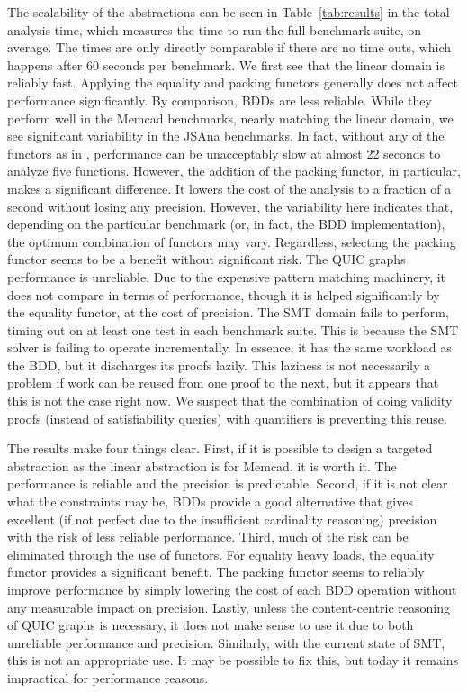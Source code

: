 The scalability of the abstractions can be seen in Table~\ref{tab:results} in the total analysis time, which measures the time to run the full benchmark suite, on average.  The times are only directly comparable if there are no time outs, which happens after 60 seconds per benchmark.  We first see that the linear domain is reliably fast.  Applying the equality and packing functors generally does not affect performance significantly.  By comparison, BDDs are less reliable.  While they perform well in the Memcad benchmarks, nearly matching the linear domain, we see significant variability in the JSAna benchmarks.  In fact, without any of the functors as in \cite{ab:ecoop:13}, performance can be unacceptably slow at almost 22 seconds to analyze five functions.  However, the addition of the packing functor, in particular, makes a significant difference.  It lowers the cost of the analysis to a fraction of a second without losing any precision.  However, the variability here indicates that, depending on the particular benchmark (or, in fact, the BDD implementation), the optimum combination of functors may vary.  Regardless, selecting the packing functor seems to be a benefit without significant risk.  The QUIC graphs performance is unreliable.  Due to the expensive pattern matching machinery, it does not compare in terms of performance, though it is helped significantly by the equality functor, at the cost of precision.  The SMT domain fails to perform, timing out on at least one test in each benchmark suite.  This is because the SMT solver is failing to operate incrementally.  In essence, it has the same workload as the BDD, but it discharges its proofs lazily.  This laziness is not necessarily a problem if work can be reused from one proof to the next, but it appears that this is not the case right now.  We suspect that the combination of doing validity proofs (instead of satisfiability queries) with quantifiers is preventing this reuse.

The results make four things clear.
First, if it is possible to design a targeted abstraction as the linear
abstraction is for Memcad, it is worth it.
The performance is reliable and the precision is predictable.
Second, if it is not clear what the constraints may be, BDDs provide a
good alternative that gives excellent (if not perfect due to the
insufficient cardinality reasoning) precision with the risk of less
reliable performance.
Third, much of the risk can be eliminated through the use of functors.  For equality heavy loads, the equality functor provides a significant benefit.  The packing functor seems to reliably improve performance by simply lowering the cost of each BDD operation without any measurable impact on precision.  Lastly, unless the content-centric reasoning of QUIC graphs is necessary, it does not make sense to use it due to both unreliable performance and precision.  Similarly, with the current state of SMT, this is not an appropriate use.  It may be possible to fix this, but today it remains impractical for performance reasons.






